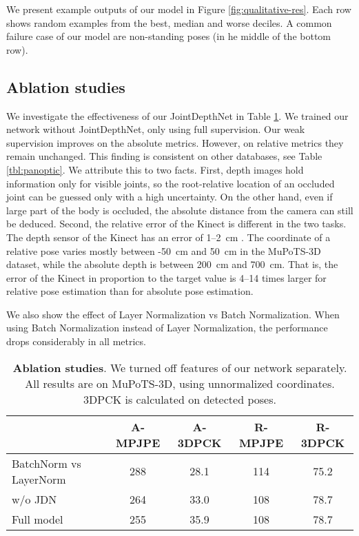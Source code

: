 \documentclass[runningheads]{llncs}
\begin{document}
We present example outputs of our model in Figure \ref{fig:qualitative-res}. Each row shows random examples from the best, median and worse deciles. A common failure case of our model are non-standing poses (in he middle of the bottom row).

\subsection{Ablation studies}
We investigate the effectiveness of our JointDepthNet in Table \ref{tbl:ablation}. We trained our network without JointDepthNet, only using full supervision. Our weak supervision improves on the absolute metrics. However, on relative metrics they remain unchanged. This finding is consistent on other databases, see Table \ref{tbl:panoptic}. We attribute this to two facts. First, depth images hold information only for visible joints, so the root-relative location of an occluded joint can be guessed only with a high uncertainty. On the other hand, even if large part of the body is occluded, the absolute distance from the camera can still be deduced. Second, the relative error of the Kinect is different in the two tasks. The depth sensor of the Kinect has an error of 1--2~cm \cite{wasenmuller2017kinecterror}. The  coordinate of a relative pose varies mostly between -50~cm and 50~cm in the MuPoTS-3D dataset, while the absolute depth is between 200~cm and 700~cm. That is, the error of the Kinect in proportion to the target value is 4--14 times larger for relative pose estimation than for absolute pose estimation.

We also show the effect of Layer Normalization vs Batch Normalization. When using Batch Normalization instead of Layer Normalization, the performance drops considerably in all metrics.

\begin{table}[h]
\caption{\textbf{Ablation studies}. We turned off features of our network separately. All results are on MuPoTS-3D, using unnormalized coordinates. 3DPCK is calculated on detected poses. }
\label{tbl:ablation}
\begin{center}
\begin{tabular}{lcccc}

& A-MPJPE  & A-3DPCK  & R-MPJPE  & R-3DPCK    \\
\hline
BatchNorm vs LayerNorm & 288 & 28.1 & 114 & 75.2  \\  
w/o JDN & 264 & 33.0 & 108 & 78.7 \\ 
\hline

Full model & 255 & 35.9 & 108 & 78.7 \\ 
\end{tabular}
\end{center}
\end{table}
\end{document}
